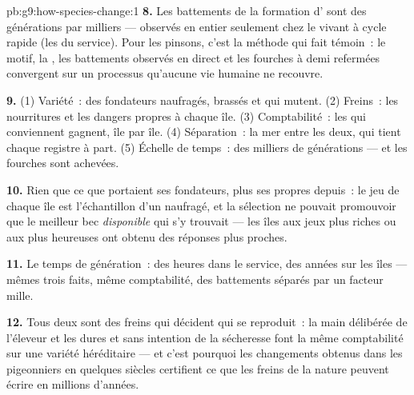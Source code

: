 \begin{solution}{pb:g9:how-species-change:1}
\textbf{8.} Les battements de la formation d' sont
des générations par milliers --- observés en entier
seulement chez le vivant à cycle rapide (les  du
service). Pour les pinsons, c'est la méthode qui fait
témoin~: le motif, la , les battements observés en
direct et les fourches à demi refermées convergent sur un
processus qu'aucune vie humaine ne recouvre.

\textbf{9.} (1) Variété~: des fondateurs naufragés, brassés
et qui mutent. (2) Freins~: les nourritures et les dangers
propres à chaque île. (3) Comptabilité~: les  qui
conviennent gagnent, île par île. (4) Séparation~: la mer
entre les deux, qui tient chaque registre à part. (5)
Échelle de temps~: des milliers de générations --- et les
fourches sont achevées.

\textbf{10.} Rien que ce que portaient ses fondateurs, plus
ses propres  depuis~: le jeu de chaque île est
l'échantillon d'un naufragé, et la sélection ne pouvait
promouvoir que le meilleur bec \emph{disponible} qui s'y
trouvait --- les îles aux jeux plus riches ou aux 
plus heureuses ont obtenu des réponses plus proches.

\textbf{11.} Le temps de génération~: des heures dans le
service, des années sur les îles --- mêmes trois faits, même
comptabilité, des battements séparés par un facteur mille.

\textbf{12.} Tous deux sont des freins qui décident qui se
reproduit~: la main délibérée de l'éleveur et les 
dures et sans intention de la sécheresse font la même
comptabilité sur une variété héréditaire --- et c'est
pourquoi les changements obtenus dans les pigeonniers en
quelques siècles certifient ce que les freins de la nature
peuvent écrire en millions d'années.
\end{solution}
